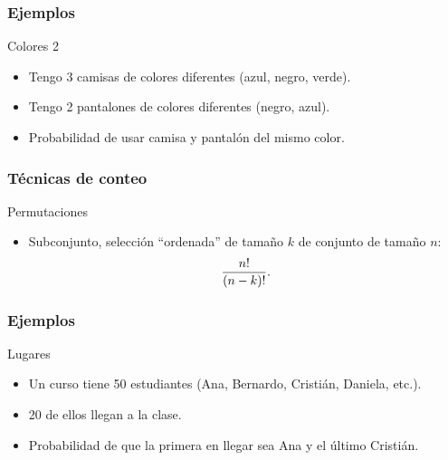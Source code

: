 \documentclass[table]{beamer}
\begin{document}
\begin{frame}
    \frametitle{Ejemplos}
    \begin{block}{Colores 2}
        \begin{itemize}
            \item Tengo 3 camisas de colores diferentes (azul, negro, verde).
            \item Tengo 2 pantalones de colores diferentes (negro, azul).
            \item Probabilidad de usar camisa y pantalón del mismo color.
        \end{itemize}
    \end{block}
\end{frame}

\begin{frame}
    \frametitle{Técnicas de conteo}
    \begin{block}{Permutaciones}
        \begin{itemize}
            \item Subconjunto, selección ``ordenada'' de tamaño $k$ de conjunto de tamaño $n$:
                \begin{equation*}
                    \frac{n !}{\parens{n - k} !} .
                \end{equation*}
        \end{itemize}
    \end{block}
\end{frame}

\begin{frame}
    \frametitle{Ejemplos}
    \begin{block}{Lugares}
        \begin{itemize}
            \item Un curso tiene 50 estudiantes (Ana, Bernardo, Cristián, Daniela, etc.).
            \item 20 de ellos llegan a la clase.
            \item Probabilidad de que la primera en llegar sea Ana y el último Cristián.
        \end{itemize}
    \end{block}
\end{frame}
\end{document}
